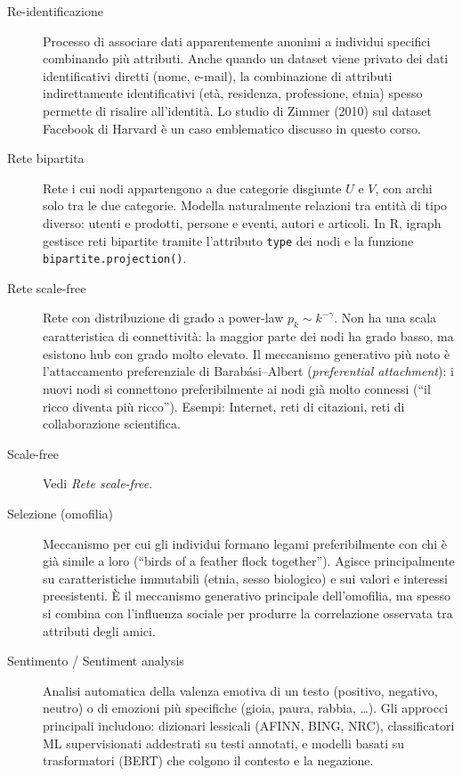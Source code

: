 \documentclass[12pt,a4paper]{article}
\begin{document}
\begin{description}
  \item[Re-identificazione] Processo di associare dati apparentemente anonimi a
  individui specifici combinando più attributi. Anche quando un dataset viene privato
  dei dati identificativi diretti (nome, e-mail), la combinazione di attributi
  indirettamente identificativi (età, residenza, professione, etnia) spesso permette
  di risalire all'identità. Lo studio di Zimmer (2010) sul dataset Facebook di Harvard
  è un caso emblematico discusso in questo corso.

  \item[Rete bipartita] Rete i cui nodi appartengono a due categorie disgiunte $U$ e
  $V$, con archi solo tra le due categorie. Modella naturalmente relazioni tra entità
  di tipo diverso: utenti e prodotti, persone e eventi, autori e articoli. In R, igraph
  gestisce reti bipartite tramite l'attributo \texttt{type} dei nodi e la funzione
  \texttt{bipartite.projection()}.

  \item[Rete scale-free] Rete con distribuzione di grado a power-law $p_k \sim
  k^{-\gamma}$. Non ha una scala caratteristica di connettività: la maggior parte dei
  nodi ha grado basso, ma esistono hub con grado molto elevato. Il meccanismo generativo
  più noto è l'attaccamento preferenziale di Barabási–Albert (\textit{preferential
  attachment}): i nuovi nodi si connettono preferibilmente ai nodi già molto connessi
  (``il ricco diventa più ricco''). Esempi: Internet, reti di citazioni, reti di
  collaborazione scientifica.

  \item[Scale-free] Vedi \textit{Rete scale-free}.

  \item[Selezione (omofilia)] Meccanismo per cui gli individui formano legami
  preferibilmente con chi è già simile a loro (``birds of a feather flock together'').
  Agisce principalmente su caratteristiche immutabili (etnia, sesso biologico) e
  sui valori e interessi preesistenti. È il meccanismo generativo principale dell'omofilia,
  ma spesso si combina con l'influenza sociale per produrre la correlazione osservata tra
  attributi degli amici.

  \item[Sentimento / Sentiment analysis] Analisi automatica della valenza emotiva di un
  testo (positivo, negativo, neutro) o di emozioni più specifiche (gioia, paura,
  rabbia, \ldots). Gli approcci principali includono: dizionari lessicali (AFINN, BING,
  NRC), classificatori ML supervisionati addestrati su testi annotati, e modelli basati
  su trasformatori (BERT) che colgono il contesto e la negazione.


\end{description}
\end{document}

